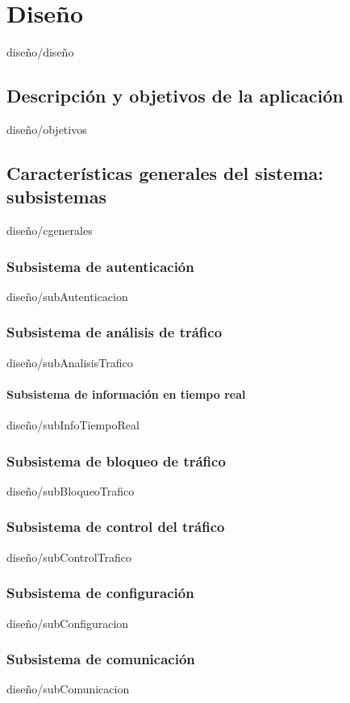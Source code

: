 \documentclass[epsbased,copyright,final,printable,covers,extendedindex,firstnumbered,tfg,gnuplot]{tfgtfmthesisuam}
\begin{document}
    

\chapter{Diseño\label{CAP:DISEÑO}}{diseño/diseño}
    \section{Descripción y objetivos de la aplicación\label{SEC:DOBJETIVOS}}{diseño/objetivos}
    \section{Características generales del sistema: subsistemas\label{SEC:CGENERALES}}{diseño/cgenerales}
         \subsection{Subsistema de autenticación\label{SEC:subAutenticacion}}{diseño/subAutenticacion}
        \subsection{Subsistema de análisis de tráfico\label{SEC:subAnalisisTrafico}}{diseño/subAnalisisTrafico}
            \subsubsection{Subsistema de información en tiempo real\label{SEC:subInfoTiempoReal}}{diseño/subInfoTiempoReal}
        \subsection{Subsistema de bloqueo de tráfico\label{SEC:subBloqueoTrafico}}{diseño/subBloqueoTrafico}
        \subsection{Subsistema de control del tráfico\label{SEC:subControlTrafico}}{diseño/subControlTrafico}
        \subsection{Subsistema de configuración\label{SEC:subConfiguracion}}{diseño/subConfiguracion}
        \subsection{Subsistema de comunicación\label{SEC:subComunicacion}}{diseño/subComunicacion}
        
\end{document}
